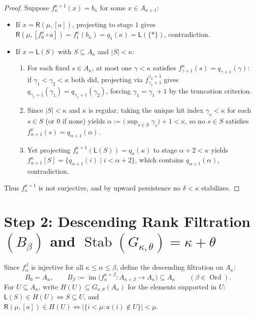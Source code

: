 \documentclass[11pt,a4paper]{article}
\theoremstyle{definition}
\theoremstyle{plain}
\newcommand{\Stab}{\operatorname{Stab}}
\newcommand{\im}{\operatorname{im}}
\newcommand{\Ord}{\operatorname{Ord}}
\begin{document}
\begin{proof}
Suppose $f_\kappa^{\kappa+1}(x) = b_\kappa$ for some $x \in A_{\kappa+1}$:
\begin{itemize}[leftmargin=2em]
  \item If $x = \mathsf{R}(\mu, [a])$, projecting to stage $1$ gives $\mathsf{R}(\mu, [f_0^\kappa \circ a]) = f_1^\kappa(b_\kappa) = q_1(\kappa) = \mathsf{L}(\{*\})$, contradiction.
  \item If $x = \mathsf{L}(S)$ with $S \subseteq A_\kappa$ and $|S| < \kappa$:
    \begin{enumerate}[label=(\arabic*)]
      \item For each fixed $s \in A_\kappa$, at most one $\gamma < \kappa$ satisfies $f_{\gamma+1}^\kappa(s) = q_{\gamma+1}(\gamma)$: if $\gamma_1 < \gamma_2 < \kappa$ both did, projecting via $f_{\gamma_1+1}^{\gamma_2+1}$ gives $q_{\gamma_1+1}(\gamma_1) = q_{\gamma_1+1}(\gamma_2)$, forcing $\gamma_1 = \gamma_1 + 1$ by the truncation criterion.
      \item Since $|S| < \kappa$ and $\kappa$ is regular, taking the unique hit index $\gamma_s < \kappa$ for each $s \in S$ (or $0$ if none) yields $\alpha := \bigl(\sup_{s \in S} \gamma_s\bigr) + 1 < \kappa$, so no $s \in S$ satisfies $f_{\alpha+1}^\kappa(s) = q_{\alpha+1}(\alpha)$.
      \item Yet projecting $f_\kappa^{\kappa+1}(\mathsf{L}(S)) = q_\kappa(\kappa)$ to stage $\alpha + 2 < \kappa$ yields $f_{\alpha+1}^\kappa[S] = \{ q_{\alpha+1}(i) \mid i < \alpha + 2 \}$, which contains $q_{\alpha+1}(\alpha)$, contradiction.
    \end{enumerate}
\end{itemize}
Thus $f_\kappa^{\kappa+1}$ is not surjective, and by upward persistence no $\delta < \kappa$ stabilizes.
\end{proof}

\section{Step 2: Descending Rank Filtration $(B_\beta)$ and $\Stab(G_{\kappa,\theta}) = \kappa + \theta$}

Since $f_\alpha^\beta$ is injective for all $\kappa \le \alpha \le \beta$, define the descending filtration on $A_\kappa$:
\[
  B_0 = A_\kappa, \qquad B_\beta := \im\bigl(f_\kappa^{\kappa+\beta} : A_{\kappa+\beta} \to A_\kappa\bigr) \subseteq A_\kappa \qquad (\beta \in \Ord).
\]
For $U \subseteq A_\kappa$, write $H(U) \subseteq G_{\kappa,\theta}(A_\kappa)$ for the elements supported in $U$: $\mathsf{L}(S) \in H(U) \iff S \subseteq U$, and $\mathsf{R}(\mu, [a]) \in H(U) \iff \bigl|\{i < \mu : a(i) \notin U\}\bigr| < \mu$.
\end{document}
